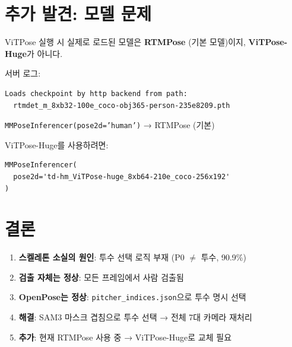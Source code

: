 \documentclass[11pt, a4paper]{article}
\begin{document}
\section{추가 발견: 모델 문제}

\begin{warningbox}
ViTPose 실행 시 실제로 로드된 모델은 \textbf{RTMPose} (기본 모델)이지,
\textbf{ViTPose-Huge}가 아니다.

서버 로그:
\begin{verbatim}
Loads checkpoint by http backend from path:
  rtmdet_m_8xb32-100e_coco-obj365-person-235e8209.pth
\end{verbatim}

\texttt{MMPoseInferencer(pose2d='human')} → RTMPose (기본)

ViTPose-Huge를 사용하려면:
\begin{verbatim}
MMPoseInferencer(
  pose2d='td-hm_ViTPose-huge_8xb64-210e_coco-256x192'
)
\end{verbatim}
\end{warningbox}


\section{결론}

\begin{enumerate}[leftmargin=*]
  \item \textbf{스켈레톤 소실의 원인}: 투수 선택 로직 부재 (P0 $\neq$ 투수, 90.9\%)
  \item \textbf{검출 자체는 정상}: 모든 프레임에서 사람 검출됨
  \item \textbf{OpenPose는 정상}: \texttt{pitcher\_indices.json}으로 투수 명시 선택
  \item \textbf{해결}: SAM3 마스크 겹침으로 투수 선택 → 전체 7대 카메라 재처리
  \item \textbf{추가}: 현재 RTMPose 사용 중 → ViTPose-Huge로 교체 필요
\end{enumerate}
\end{document}
